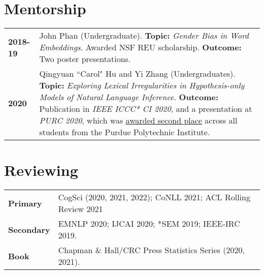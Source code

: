 \documentclass[11pt]{article}
\begin{document}
\renewcommand*{\arraystretch}{1.5}

\section*{Mentorship}
\vspace{-1em}
\begin{longtable}{p{}  p{} }
    \textbf{2018-19} & John Phan (Undergraduate). \textbf{Topic:} \textit{Gender Bias in Word Embeddings}. Awarded NSF REU scholarship. \textbf{Outcome:} Two poster presentations.\\
    \textbf{2020} & Qingyuan ``Carol" Hu and Yi Zhang (Undergraduates). \textbf{Topic:} \textit{Exploring Lexical Irregularities in Hypothesis-only Models of Natural Language Inference.} \textbf{Outcome:} Publication in \textit{IEEE ICCC* CI 2020}, and a presentation at \textit{PURC 2020}, which was \underline{awarded second place} across all students from the Purdue Polytechnic Institute.
\end{longtable}

\section*{Reviewing}
\vspace{-1em}
\begin{longtable}{p{}  p{} }
    \textbf{Primary} & CogSci (2020, 2021, 2022); CoNLL 2021; ACL Rolling Review 2021\\
    \textbf{Secondary} & EMNLP 2020; IJCAI 2020; *SEM 2019; IEEE-IRC 2019.\\
    \textbf{Book} & Chapman \& Hall/CRC Press Statistics Series (2020, 2021).
\end{longtable}
\end{document}
